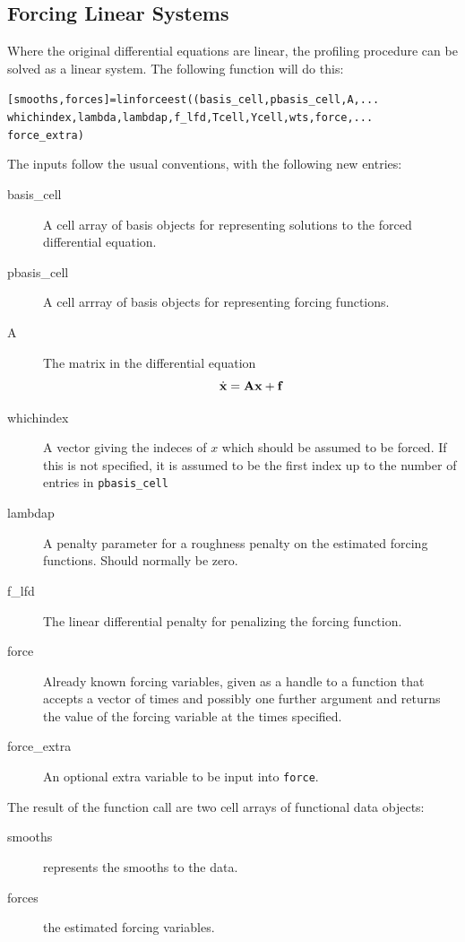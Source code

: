 \documentclass{article}
\newcommand{\fbold}    {\mbox{\bf f}}
\newcommand{\xbold}    {\mbox{\bf x}}
\newcommand{\Abold}    {\mbox{\bf A}}
\newcommand{\nt}    {\noindent}
\begin{document}
\subsection{Forcing Linear Systems}

Where the original differential equations are linear, the profiling
procedure can be solved as a linear system. The following function
will do this:

\begin{alltt}
  [smooths,forces] = linforceest((basis\_cell,pbasis\_cell,A,...
    whichindex,lambda,lambdap,f\_lfd,Tcell,Ycell,wts,force,...
    force_extra)
\end{alltt}

\nt The inputs follow the usual conventions, with the following new entries:

\begin{description}
\item[basis\_cell] A cell array of basis objects for representing
  solutions to the forced differential equation.
\item[pbasis\_cell] A cell arrray of basis objects for representing
  forcing functions.
\item[A] The matrix in the differential equation
\[ \dot{\xbold} = \Abold \xbold + \fbold \]
\item[whichindex] A vector giving the indeces of $x$ which should be
  assumed to be forced. If this is not specified, it is assumed to be
  the first index up to the number of entries in {\tt pbasis\_cell}
\item[lambdap] A penalty parameter for a roughness penalty on the
  estimated forcing functions. Should normally be zero.
\item[f\_lfd] The linear differential penalty for penalizing the
  forcing function.
\item[force] Already known forcing variables, given as a handle to a
  function that accepts a vector of times and possibly one further
  argument and returns the value of the forcing variable at the times
  specified.
\item[force\_extra] An optional extra variable to be input into
  {\tt force}.
\end{description}

\nt The result of the function call are two cell arrays of functional data
objects:

\begin{description}
\item[smooths] represents the smooths to the data.
\item[forces] the estimated forcing variables.
\end{description}
\end{document}
